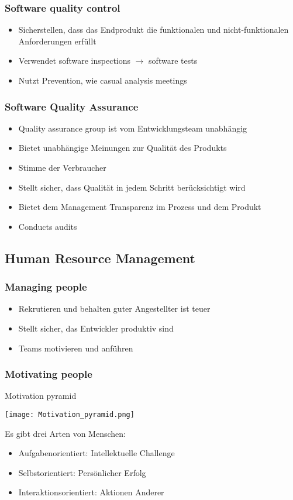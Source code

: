 \subsubsection{Software quality control}
\begin{itemize}
	\item Sicherstellen, dass das Endprodukt die funktionalen und nicht-funktionalen Anforderungen erfüllt
	\item Verwendet software inspections $\to$ software tests
	\item Nutzt Prevention, wie casual analysis meetings
\end{itemize}
\subsubsection{Software Quality Assurance}
\begin{itemize}
	\item Quality assurance group ist vom Entwicklungsteam unabhängig
	\item Bietet unabhängige Meinungen zur Qualität des Produkts
	\item Stimme der Verbraucher
	\item Stellt sicher, dass Qualität in jedem Schritt berücksichtigt wird
	\item Bietet dem Management Transparenz im Prozess und dem Produkt
	\item Conducts audits
\end{itemize}
\subsection{Human Resource Management}
\subsubsection{Managing people}
\begin{itemize}
	\item Rekrutieren und behalten guter Angestellter ist teuer
	\item Stellt sicher, das Entwickler produktiv sind
	\item Teams motivieren und anführen 🤣
\end{itemize}
\subsubsection{Motivating people}
\begin{table}[H]
\caption{Motivation pyramid}
\begin{center}
	\texttt{[image: Motivation\_pyramid.png]}
\end{center}	
\end{table}
Es gibt drei Arten von Menschen:
\begin{itemize}
	\item Aufgabenorientiert: Intellektuelle Challenge 
	\item Selbstorientiert: Persönlicher Erfolg
	\item Interaktionsorientiert: Aktionen Anderer
\end{itemize}
